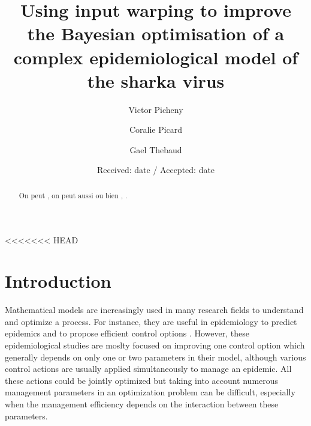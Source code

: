<<<<<<< HEAD
	
	\title{Using input warping to improve the Bayesian optimisation of a complex epidemiological model of the sharka virus %
	}
	
	
	\author{Victor Picheny         \and
		Coralie Picard        \and
		Gael Thebaud
	}
	
	
	
	\date{Received: date / Accepted: date}
	
	\maketitle
	
	
	\begin{abstract}
		On peut  , on peut aussi  ou bien , .
	\end{abstract}
	
	\section{Introduction}
	
	Mathematical models are increasingly used in many research fields to understand and optimize a process. For instance, 
	they are useful in epidemiology to predict epidemics and to propose efficient control options 
	\cite{cunniffe2015thirteen,cunniffe2016modeling,mushayabasa2015modeling,tildesley2006optimal,bajardi2012optimizing,kompas2017optimal,vanderwaal2017optimal,grechi2012designing}.
	However, these epidemiological studies are moslty focused on improving one control option which generally depends on only one or two parameters in their model, 
	although various control actions are usually applied simultaneously to manage an epidemic. All these actions could be jointly optimized but taking into account numerous management parameters in an optimization problem can be difficult,
	especially when the management efficiency depends on the interaction between these parameters.
	
